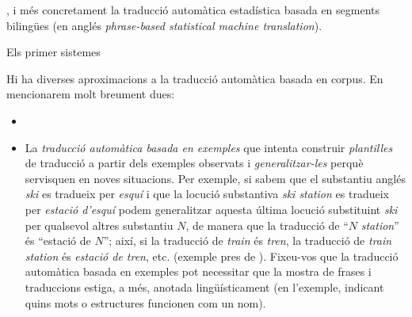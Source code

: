 , i més
concretament la traducció automàtica estadística basada en segments
bilingües (en anglés \emph{phrase-based statistical machine
  translation}).

Els primer sistemes




Hi ha diverses aproximacions a la traducció automàtica basada en
corpus. En mencionarem molt breument dues:
\begin{itemize}
\item 
\item La \emph{traducció automàtica basada en exemples} que intenta
construir \emph{plantilles} de traducció a partir dels exemples
observats i \emph{generalitzar-les} perquè servisquen en noves
situacions. Per exemple, si sabem que el substantiu anglés \emph{ski}
es tradueix per \emph{esquí} i que la locució substantiva \emph{ski
  station} es tradueix per \emph{estació d'esquí} podem generalitzar
aquesta última locució substituint \emph{ski} per qualsevol altres
substantiu $N$, de manera que la traducció de ``$N$ \emph{station}''
és ``estació de $N$''; així, si la traducció de \emph{train} és
\emph{tren}, la traducció de \emph{train station} és \emph{estació de
  tren}, etc. (exemple pres de \citealt{carl01j}). Fixeu-vos que la traducció automàtica basada en exemples
pot necessitar que la mostra de frases i traduccions estiga, a més,
anotada lingüísticament (en l'exemple, indicant quins mots o
estructures funcionen com un nom).
\end{itemize}

